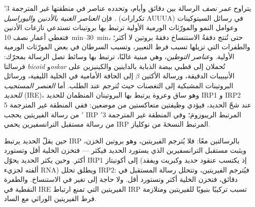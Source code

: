 \begin{definition}\label{def:b3:rna-regulation:stability}
يتراوح \emph{عمر نصف} الرسالة بين دقائق وأيام، وتحدده عناصر في منطقتها
غير المترجمة 3$'$. فإن \emph{العناصر الغنية بالأدنين واليوراسيل}
(تكرارات AUUUA) في رسائل السيتوكينات وعوامل النمو والمورّثات الورمية
الأولية ترتبط بها بروتينات تستدعي نازعات الأدنين فتعطي أعمار نصف
\qtyrange{10}{30}{min}، حتى تُنتج دفقةُ الاستنساخ دفقةَ بروتين لا
أكثر؛ والطفرات التي تزيلها تسبب فرط التعبير، وتسبب السرطان في بعض
المورّثات الورمية الأولية. و\emph{عناصر التوطين}، وهي مبنية غالبًا،
ترتبط بها وسائط تصل الرسالة بمحرّك: فرسالتا \emph{bicoid}
و\emph{oskar} تُحملان إلى قطبي بيضة الذبابة بالداينين
والكينيزين على الأنيبيبات الدقيقة، ورسالة الأكتين $\beta$ إلى الحافة
الأمامية في الخلية الليفية، ورسائل البروتينات المشبكية إلى التغصنات
حيث تُترجم عند الطلب. أما \emph{العنصر المستجيب للحديد}
(IRE)، وهو ساق وعروة يرتبط بها البروتينان المنظمان للحديد IRP1 و
IRP2 عند شحّ الحديد، فيؤدي وظيفتين متعاكستين من موضعين: ففي المنطقة
غير المترجمة 5$'$ من رسالة الفيريتين يحجب IRP المرتبط الريبوزومَ؛ وفي
المنطقة غير المترجمة 3$'$ من رسالة مستقبل الترانسفيرين يحمي IRP
المرتبط النسخةَ من نوكلياز.
\end{definition}

\begin{example}\label{ex:b3:rna-regulation:iron}
حين يقلّ الحديد يرتبط IRP بالرسالتين معًا: فلا يُترجم الفيريتين، وهو
بروتين الخزن، ويثبت مستقبل الترانسفيرين الذي يستورد الحديد فيكثر ---
فتخزن الخلية أقل وتستورد أكثر. وحين يكثر الحديد يحوّل IRP1 إلى
أكونيتاز (إذ يكتسب عنقود حديد وكبريت ويفقد ألفته لجزيء RNA) ويطلق تحلل
IRP2: فيُترجم الفيريتين، وتتحلل رسالة المستقبل في دقائق، فتخزن الخلية
أكثر وتستورد أقل. ولا حاجة إلى تغير في الاستنساخ. والطفرة النقطية في
IRE الفيريتين التي تمنع ارتباط IRP تسبب تركيبًا بنيويًا للفيريتين
ومتلازمة فرط الفيريتين الوراثي مع الساد.
\end{example}

